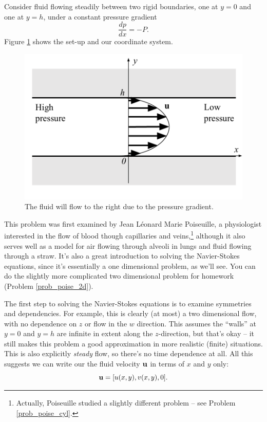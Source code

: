 Consider fluid flowing steadily between two rigid boundaries, one at $y=0$ and one at $y = h$, under a constant pressure gradient 
\[
\frac{dp}{dx} = -P.
\]
Figure \ref{fig_poise_setup} shows the set-up and our coordinate system.

\begin{figure}
\centering
\includegraphics[width=0.7\linewidth]{Figures/Chapter2/fig_poise_setup}
\caption{The fluid will flow to the right due to the pressure gradient.}
\label{fig_poise_setup}
\end{figure}

This problem was first examined by Jean L\'eonard Marie Poiseuille, a physiologist interested in the flow of blood though capillaries and veins,\footnote{Actually, Poiseuille studied a slightly different problem -- see Problem \ref{prob_poise_cyl}.} although it also serves well as a model for air flowing through alveoli in lungs and fluid flowing through a straw.  It's also a great introduction to solving the Navier-Stokes equations, since it's essentially a one dimensional problem, as we'll see.  You can do the slightly more complicated two dimensional problem for homework (Problem \ref{prob_poise_2d}).

The first step to solving the Navier-Stokes equations is to examine symmetries and dependencies.  For example, this is clearly (at most) a two dimensional flow, with no dependence on $z$ or flow in the $w$ direction.  This assumes the ``walls'' at $y=0$ and $y=h$ are infinite in extent along the $z$-direction, but that's okay -- it still makes this problem a good approximation in more realistic (finite) situations.  This is also explicitly \emph{steady} flow, so there's no time dependence at all.  All this suggests we can write our the fluid velocity $\mathbf{u}$ in terms of $x$ and $y$ only:
\[
\mathbf{u} = [ u(x, y), v(x, y), 0].
\]

